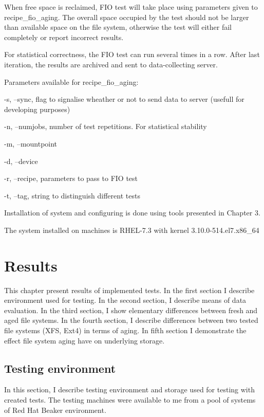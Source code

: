 \documentclass[
  color, %
  table, %
  lof,   %
  lot,   %
]{fithesis3}
\begin{document}
When free space is reclaimed, FIO test will take place using parameters given to recipe\_fio\_aging. The overall space occupied by the test should not be larger than available space on the file system, otherwise the test will either fail completely or report incorrect results.

For statistical correctness, the FIO test can run several times in a row. After last iteration, the results are archived and sent to data-collecting server.

Parameters available for recipe\_fio\_aging:
\begin{compactenum}
  \item -s, --sync, flag to signalise wheather or not to send data to server (usefull for developing purposes)
  \item -n, --numjobs, number of test repetitions. For statistical stability
  \item -m, --mountpoint
  \item -d, --device
  \item -r, --recipe, parameters to pass to FIO test
  \item -t, --tag, string to distinguish different tests
  \end{compactenum}



Installation of system and configuring is done using tools presented in Chapter 3. 

The system installed on machines is RHEL-7.3 with kernel 3.10.0-514.el7.x86\_64


\chapter{Results}
This chapter present results of implemented tests. In the first section I describe environment used for testing. In the second section, I describe means of data evaluation. In the third section, I show elementary differences between fresh and aged file systems. In the fourth section, I describe differences between two tested file systems (XFS, Ext4) in terms of aging. In fifth section I demonstrate the effect file system aging have on underlying storage.

\section{Testing environment}
In this section, I describe testing environment and storage used for testing with created tests. The testing machines were available to me from a pool of systems of Red Hat Beaker environment.
\end{document}
